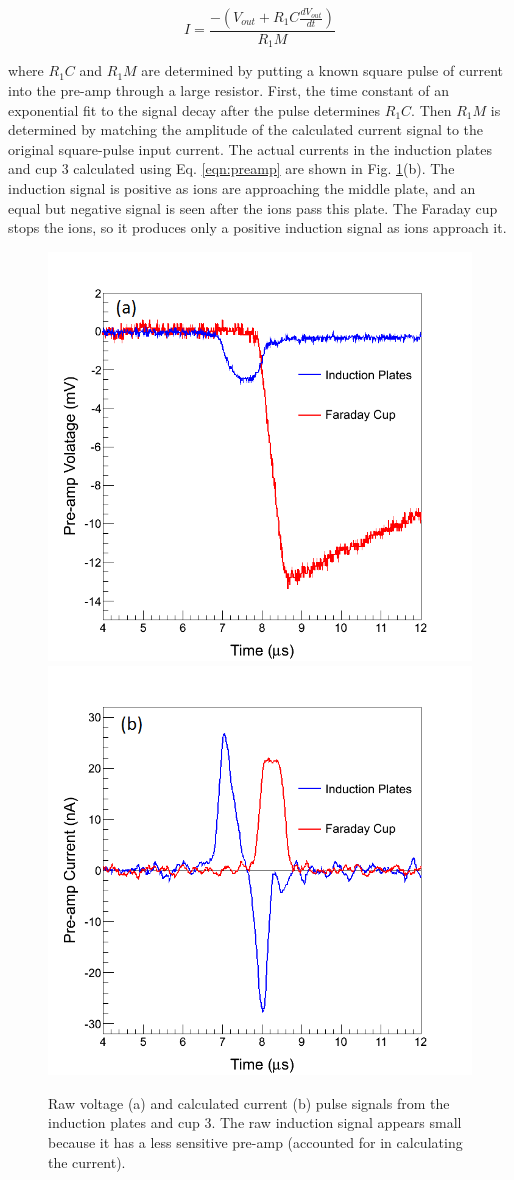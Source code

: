 \begin{equation}
I = \frac{-(V_{out} + R_{1} C \frac{dV_{out}}{dt})}{R_{1} M}
\label{eqn:preamp}
\end{equation}

\noindent
where $R_{1} C$ and $R_{1} M$ are determined by putting a known square pulse of current into the pre-amp through a large resistor.  First, the time constant of an exponential fit to the signal decay after the pulse determines $R_{1} C$.  Then $R_{1} M$ is determined by matching the amplitude of the calculated current signal to the original square-pulse input current.  The actual currents in the induction plates and cup 3 calculated using Eq. \ref{eqn:preamp} are shown in Fig. \ref{fig:pulse_raw_shaped}(b).  The induction signal is positive as ions are approaching the middle plate, and an equal but negative signal is seen after the ions pass this plate.  The Faraday cup stops the ions, so it produces only a positive induction signal as ions approach it.

\begin{figure} %
                \includegraphics[width=.49\textwidth]{figures/pulse_ind_cup3_raw.png}
                \includegraphics[width=.49\textwidth]{figures/pulse_ind_cup3_shaped.png}
                \caption{Raw voltage (a) and calculated current (b) pulse signals from the induction plates and cup 3.  The raw induction signal appears small because it has a less sensitive pre-amp (accounted for in calculating the current).}
        \label{fig:pulse_raw_shaped}
\end{figure}

